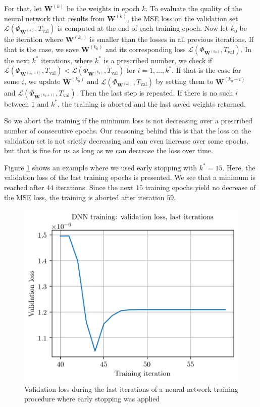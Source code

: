 For that, let $\mathbf{W}^{(k)}$ be the weights in epoch $k$. To evaluate the quality of the neural network that results from $\mathbf{W}^{(k)}$, the MSE loss on the validation set $\mathscr{L}(\Phi_{\mathbf{W}^{(k)}},T_\mathrm{val})$ is computed at the end of each training epoch. Now let $k_0$ be the iteration where $\mathbf{W}^{(k_0)}$ is smaller than the losses in all previous iterations. If that is the case, we save $\mathbf{W}^{(k_0)}$ and its corresponding loss $\mathscr{L}(\Phi_{\mathbf{W}^{(k_0)}},T_\mathrm{val})$. In the next $k^*$ iterations, where $k^*$ is a prescribed number, we check if $\mathscr{L}(\Phi_{\mathbf{W}^{(k_0+i)}},T_\mathrm{val})<\mathscr{L}(\Phi_{\mathbf{W}^{(k_0)}},T_\mathrm{val})$ for $i=1,\dotsc,k^*$. If that is the case for some $i$, we update $\mathbf{W}^{(k_0)}$ and $\mathscr{L}(\Phi_{\mathbf{W}^{(k_0)}},T_\mathrm{val})$ by setting them to $\mathbf{W}^{(k_0+i)}$ and $\mathscr{L}(\Phi_{\mathbf{W}^{(k_0+i)}},T_\mathrm{val})$. Then the last step is repeated. If there is no such $i$ between $1$ and $k^*$, the training is aborted and the last saved weights returned.

So we abort the training if the minimum loss is not decreasing over a prescribed number of consecutive epochs. Our reasoning behind this is that the loss on the validation set is not srictly decreasing and can even increase over some epochs, but that is fine for us as long as we can decrease the loss over time.

Figure \ref{earlyStoppingPlot} shows an example where we used early stopping with $k^*=15$. Here, the validation loss of the last training epochs is presented. We see that a minimum is reached after $44$ iterations. Since the next $15$ training epochs yield no decrease of the MSE loss, the training is aborted after iteration $59$.\\

\begin{figure}
\centering
\includegraphics{Plots/earlyStopping.png}
\caption{\label{earlyStoppingPlot}Validation loss during the last iterations of a neural network training procedure where early stopping was applied}
\end{figure}

